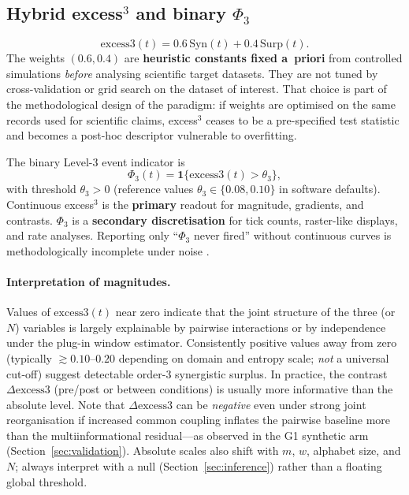 \documentclass[11pt,a4paper]{article}
\begin{document}
\subsection{Hybrid excess$^3$ and binary $\Phi_3$}
\label{sec:hybrid}

\begin{equation}
\label{eq:excess3}
\mathrm{excess3}(t)
=0.6\,\mathrm{Syn}(t)+0.4\,\mathrm{Surp}(t).
\end{equation}
The weights $(0.6,0.4)$ are \textbf{heuristic constants fixed a~priori}
from controlled simulations \emph{before} analysing scientific target
datasets. They are not tuned by cross-validation or grid search on the
dataset of interest. That choice is part of the methodological design of
the paradigm: if weights are optimised on the same records used for
scientific claims, excess$^3$ ceases to be a pre-specified test statistic
and becomes a post-hoc descriptor vulnerable to overfitting.

The binary Level-3 event indicator is
\begin{equation}
\label{eq:phi3}
\Phi_3(t)=\mathbf{1}\bigl\{\mathrm{excess3}(t)>\theta_3\bigr\},
\end{equation}
with threshold $\theta_3>0$ (reference values $\theta_3\in\{0.08,0.10\}$ in
software defaults). Continuous excess$^3$ is the \textbf{primary} readout
for magnitude, gradients, and contrasts. $\Phi_3$ is a
\textbf{secondary discretisation} for tick counts, raster-like displays,
and rate analyses. Reporting only ``$\Phi_3$ never fired'' without
continuous curves is methodologically incomplete under noise
\citep{Padilla2026framework}.

\paragraph{Interpretation of magnitudes.}
Values of $\mathrm{excess3}(t)$ near zero indicate that the joint structure of
the three (or $N$) variables is largely explainable by pairwise interactions
or by independence under the plug-in window estimator.
Consistently positive values away from zero
(typically $\gtrsim 0.10$--$0.20$ depending on domain and entropy scale;
\emph{not} a universal cut-off) suggest detectable order-3 synergistic
surplus.
In practice, the contrast $\Delta\mathrm{excess3}$ (pre/post or between
conditions) is usually more informative than the absolute level.
Note that $\Delta\mathrm{excess3}$ can be \emph{negative} even under strong
joint reorganisation if increased common coupling inflates the pairwise
baseline more than the multiinformational residual---as observed in the G1
synthetic arm (Section~\ref{sec:validation}).
Absolute scales also shift with $m$, $w$, alphabet size, and $N$; always
interpret with a null (Section~\ref{sec:inference}) rather than a floating
global threshold.
\end{document}
